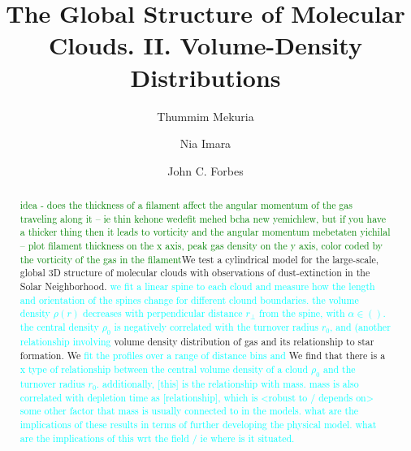 \documentclass[twocolumn]{aastex631}
\begin{document}
\title{The Global Structure of Molecular Clouds. II. Volume-Density Distributions}

\author[0009-0004-7985-6342]{Thummim Mekuria}


\author[0000-0002-6001-598X]{Nia Imara}

\author{John C. Forbes}


\begin{abstract}
\textcolor{green}{idea - does the thickness of a filament affect the angular momentum of the gas traveling along it -- ie thin kehone wedefit mehed bcha new yemichlew, but if you have a thicker thing then it leads to vorticity and the angular momentum mebetaten yichilal -- plot filament thickness on the x axis, peak gas density on the y axis, color coded by the vorticity of the gas in the filament}We test a cylindrical model for the large-scale, global 3D structure of molecular clouds with observations of dust-extinction in the Solar Neighborhood. \textcolor{cyan}{we fit a linear spine to each cloud and measure how the length and orientation of the spines change for different clound boundaries. the volume density $\rho(r)$ decreases with perpendicular distance $r_\perp$ from the spine, with $\alpha \in ()$. the central density $\rho_0$ is negatively correlated with the turnover radius $r_0$, and (another relationship involving \rhoO} volume density distribution of gas and its relationship to star formation. We \textcolor{cyan}{fit the profiles over a range of distance bins and} We find that there is a \textcolor{cyan}{x type of relationship between the central volume density of a cloud $\rho_0$ and the turnover radius $r_0$. additionally, [this] is the relationship with mass. mass is also correlated with depletion time as [relationship], which is <robust to / depends on> some other factor that mass is usually connected to in the models. what are the implications of these results in terms of further developing the physical model. what are the implications of this wrt the field / ie where is it situated.}
\end{abstract}
\end{document}

